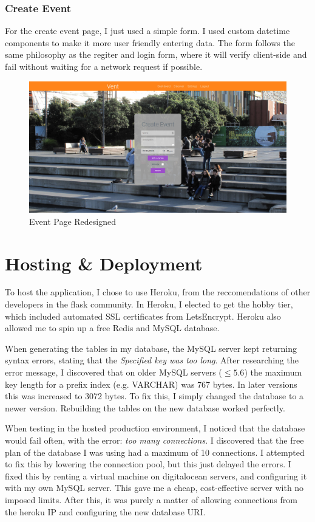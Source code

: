\documentclass[a4paper,oneside,12pt]{report}
\begin{document}
	\subsection{Create Event}
	For the create event page, I just used a simple form. I used custom datetime components to make it more user friendly entering data. The form follows the same philosophy as the regiter and login form, where it will verify client-side and fail without waiting for a network request if possible.
	\begin{figure}[H]
		\caption{Event Page Redesigned}
		\includegraphics[width=\linewidth]{static/front-end8.jpg}
	\end{figure}

	\chapter{Hosting \& Deployment}
	To host the application, I chose to use Heroku, from the reccomendations of other developers in the flask community. In Heroku, I elected to get the hobby tier, which included automated SSL certificates from LetsEncrypt. Heroku also allowed me to spin up a free Redis and MySQL database.
	
	When generating the tables in my database, the MySQL server kept returning syntax errors, stating that the \textit{Specified key was too long}. After researching the error message, I discovered that on older MySQL servers (\(\leq 5.6\)) the maximum key length for a prefix index (e.g. VARCHAR) was 767 bytes. In later versions this was increased to 3072 bytes. To fix this, I simply changed the database to a newer version. Rebuilding the tables on the new database worked perfectly.
	
	When testing in the hosted production environment, I noticed that the database would fail often, with the error: \textit{too many connections}. I discovered that the free plan of the database I was using had a maximum of 10 connections. I attempted to fix this by lowering the connection pool, but this just delayed the errors. I fixed this by renting a virtual machine on digitalocean servers, and configuring it with my own MySQL server. This gave me a cheap, cost-effective server with no imposed limits. After this, it was purely a matter of allowing connections from the heroku IP and configuring the new database URI.
	
\end{document}
